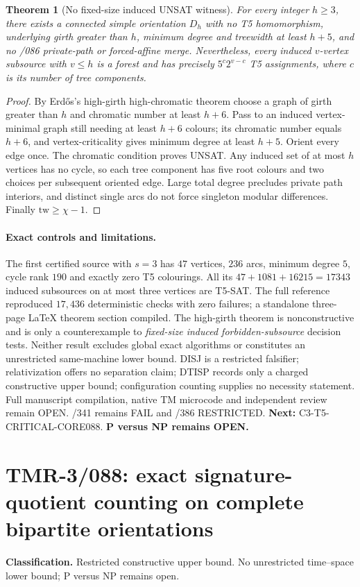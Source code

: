 \documentclass[11pt]{article}
\newtheorem{theorem}{Theorem}
\begin{document}
\begin{theorem}[No fixed-size induced UNSAT witness]
For every integer $h\ge3$, there exists a connected simple
orientation $D_h$ with no T5 homomorphism, underlying girth
greater than $h$, minimum degree and treewidth at least $h+5$,
and no /086 private-path or forced-affine merge. Nevertheless,
every induced $v$-vertex subsource with $v\le h$ is a forest
and has precisely $5^c2^{v-c}$ T5 assignments, where $c$
is its number of tree components.
\end{theorem}
\begin{proof}
By Erd\H{o}s's high-girth high-chromatic theorem choose a
graph of girth greater than $h$ and chromatic number at least
$h+6$. Pass to an induced vertex-minimal graph still needing
at least $h+6$ colours; its chromatic number equals $h+6$,
and vertex-criticality gives minimum degree at least $h+5$.
Orient every edge once. The chromatic condition proves UNSAT.
Any induced set of at most $h$ vertices has no cycle, so each
tree component has five root colours and two choices per
subsequent oriented edge. Large total degree precludes private
path interiors, and distinct single arcs do not force singleton
modular differences. Finally $\mathrm{tw}\ge\chi-1$.
\end{proof}

\paragraph{Exact controls and limitations.}
The first certified source with $s=3$ has $47$ vertices,
$236$ arcs, minimum degree $5$, cycle rank $190$ and
exactly zero T5 colourings. All its $47+1081+16215=17343$
induced subsources on at most three vertices are T5-SAT.
The full reference reproduced $17{,}436$ deterministic checks
with zero failures; a standalone three-page LaTeX theorem
section compiled. The high-girth theorem is nonconstructive
and is only a counterexample to \emph{fixed-size induced
forbidden-subsource} decision tests. Neither result excludes
global exact algorithms or constitutes an unrestricted
same-machine lower bound. DISJ is a restricted falsifier;
relativization offers no separation claim; DTISP records
only a charged constructive upper bound; configuration
counting supplies no necessity statement. Full manuscript
compilation, native TM microcode and independent review
remain OPEN. /341 remains FAIL and /386 RESTRICTED.
\textbf{Next:} C3-T5-CRITICAL-CORE088.
\textbf{P versus NP remains OPEN.}


\section{TMR-3/088: exact signature-quotient counting on complete bipartite orientations}
\noindent\textbf{Classification.} Restricted constructive upper bound. No unrestricted time--space lower bound; P versus NP remains open.
\end{document}
